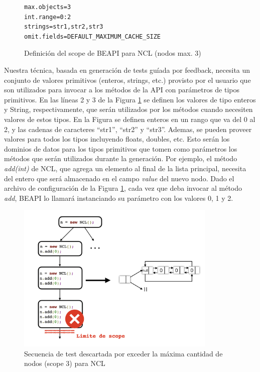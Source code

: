 
\begin{figure}[H]
\begin{lstlisting}[keywordstyle=\scriptsize\ttfamily]
max.objects=3
int.range=0:2
strings=str1,str2,str3
omit.fields=DEFAULT_MAXIMUM_CACHE_SIZE
\end{lstlisting}
\caption{Definición del scope de BEAPI para NCL (nodos max. 3)}
\label{fig:NCL-fin-BEAPI}
\end{figure}


Nuestra técnica, basada en generación de tests guíada por feedback, necesita un
conjunto de valores primitivos (enteros, strings, etc.) provisto por el usuario
que son utilizados para invocar a los métodos de la API con parámetros de
tipos primitivos. En las líneas 2 y 3 de la Figura \ref{fig:NCL-fin-BEAPI} se
definen los valores de tipo enteros y String, respectivamente, que serán utilizados por los métodos 
cuando necesiten valores de estos tipos. En la Figura se definen enteros en un
rango que va del 0 al 2, y las cadenas de caracteres ``str1'', ``str2'' y 
``str3''. Ademas, se pueden proveer valores para todos los tipos incluyendo floats, doubles, etc. 
Esto serán los dominios de datos para los tipos primitivos que tomen como
parámetros los métodos que serán utilizados durante la generación.
Por ejemplo, el método \emph{add(int)} de NCL, que agrega un elemento al final de la lista
principal, necesita del entero que será almacenado en el campo \emph{value} del nuevo nodo. 
Dado el archivo de configuración de la Figura \ref{fig:NCL-fin-BEAPI}, cada vez
que deba invocar al método \emph{add}, BEAPI lo llamará instanciando su parámetro con los valores 0,
1 y 2.

\begin{figure}[H]
    \centering
    \includegraphics[width=0.85\textwidth]{images/scope.jpg}
    \caption{Secuencia de test descartada por exceder la máxima cantidad de
    nodos (scope 3) para NCL}
    \label{fig:scope}
\end{figure}

